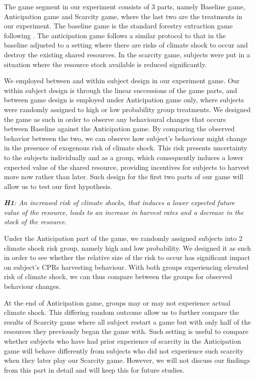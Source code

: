 The game segment in our experiment consists of 3 parts, namely Baseline game, Anticipation game and Scarcity game, where the last two are the treatments in our experiment. The baseline game is the standard forestry extraction game following \citet{janssen2013breaking}. The anticipation game follows a similar protocol to that in the baseline adjusted to a setting where there are risks of climate shock to occur and destroy the existing shared resources. In the scarcity game, subjects were put in a situation where the resource stock available is reduced significantly.

 We employed between and within subject design in our experiment game. Our within subject design is through the linear successions of the game parts, and between game design is employed under Anticipation game only, where subjects were randomly assigned to high or low probability group treatments. We designed the game as such in order to observe any behavioural changes that occurs between Baseline against the Anticipation game. By comparing the observed behavior between the two, we can observe how subject's behaviour might change in the presence of exogenous risk of climate shock. This risk presents uncertainty to the subjects individually and as a group, which consequently induces a lower expected value of the shared resource, providing incentives for subjects to harvest more now rather than later. Such design for the first two parts of our game will allow us to test our first hypothesis.

\medskip
\begin{adjustbox}{minipage=.7\textwidth,margin=0pt \smallskipamount,center}
    \itshape \noindent \textbf{H1}: An increased risk of climate shocks, that induces a lower expected future value of the resource, leads to an increase in harvest rates and a decrease in the stock of the resource.
\end{adjustbox}
\medskip

 Under the Anticipation part of the game, we randomly assigned subjects into 2 climate shock risk group, namely high and low probability. We designed it as such in order to see whether the relative size of the risk to occur has significant impact on subject's CPRs harvesting behaviour. With both groups experiencing elevated risk of climate shock, we can thus compare between the groups for observed behaviour changes.

 At the end of Anticipation game, groups may or may not experience actual climate shock. This differing random outcome allow us to further compare the results of Scarcity game where all subject restart a game but with only half of the resources they previously began the game with. Such setting is useful to compare whether subjects who have had prior experience of scarcity in the Anticipation game will behave differently from subjects who did not experience such scarcity when they later play our Scarcity game. However, we will not discuss our findings from this part in detail and will keep this for future studies.

